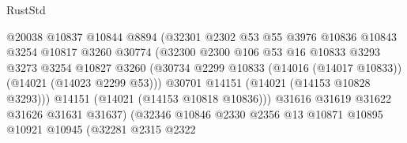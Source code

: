 \begin{lexlean}{RustStd}
\begin{coremodule}
                                      @20038
                                      @10837
                                      @10844
                                      @8894
                                      (@32301
                                        @2302
                                        @53
                                        @55
                                        @3976
                                        @10836
                                        @10843
                                        @3254
                                        @10817
                                        @3260
                                        @30774
                                        (@32300
                                          @2300
                                          @106
                                          @53
                                          @16
                                          @10833
                                          @3293
                                          @3273
                                          @3254
                                          @10827
                                          @3260
                                          (@30734
                                            @2299
                                            @10833
                                            (@14016 (@14017 @10833))
                                            (@14021 (@14023 @2299 @53)))
                                          @30701
                                          @14151
                                          (@14021 (@14153 @10828 @3293)))
                                        @14151
                                        (@14021 (@14153 @10818 @10836)))
                                      @31616
                                      @31619
                                      @31622
                                      @31626
                                      @31631
                                      @31637)
                                    (@32346
                                      @10846
                                      @2330
                                      @2356
                                      @13
                                      @10871
                                      @10895
                                      @10921
                                      @10945
                                      (@32281
                                        @2315
                                        @2322

\end{coremodule}
\end{lexlean}
